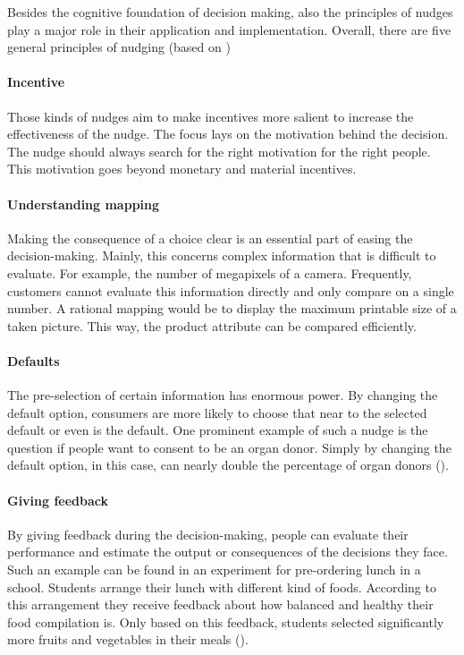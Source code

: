 Besides the cognitive foundation of decision making, also the principles of nudges play a major role in their application and implementation. Overall, there are five general principles of nudging (based on \citeyear{thaler_choice_2010})
\paragraph{Incentive}
Those kinds of nudges aim to make incentives more salient to increase the effectiveness of the nudge. The focus lays on the motivation behind the decision. The nudge should always search for the right motivation for the right people. This motivation goes beyond monetary and material incentives.
\paragraph{Understanding mapping}
Making the consequence of a choice clear is an essential part of easing the decision-making. Mainly, this concerns complex information that is difficult to evaluate. For example, the number of megapixels of a camera. Frequently, customers cannot evaluate this information directly and only compare on a single number. A rational mapping would be to display the maximum printable size of a taken picture. This way, the product attribute can be compared efficiently.
\paragraph{Defaults}
The pre-selection of certain information has enormous power. By changing the default option, consumers are more likely to choose that near to the selected default or even is the default. One prominent example of such a nudge is the question if people want to consent to be an organ donor. Simply by changing the default option, in this case, can nearly double the percentage of organ donors (\cite{johnson_defaults_2003}). 
\paragraph{Giving feedback}
By giving feedback during the decision-making, people can evaluate their performance and estimate the output or consequences of the decisions they face. Such an example can be found in an experiment for pre-ordering lunch in a school. Students arrange their lunch with different kind of foods. According to this arrangement they receive feedback about how balanced and healthy their food compilation is. Only based on this feedback, students selected significantly more fruits and vegetables in their meals (\cite{miller_effects_2016}).
